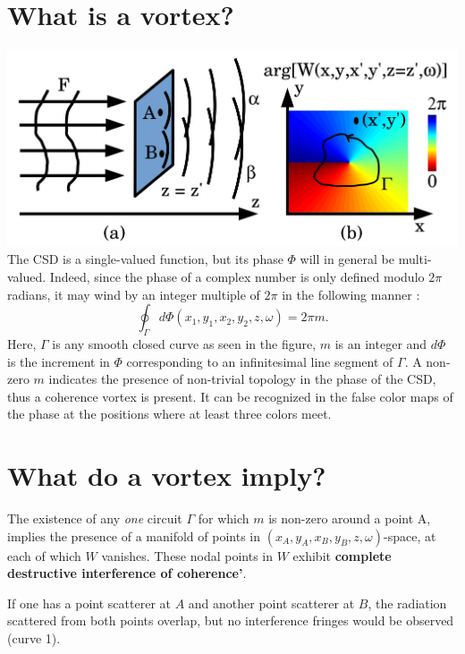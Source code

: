 \documentclass[a4paper,10pt]{article}
\begin{document}
\section{What is a vortex?}


\includegraphics[width=1\textwidth]{Figures/coherence_vortex.png}
The CSD is a single-valued function, but its phase $\Phi$ will in general be multi-valued. Indeed, since the phase of a complex number is only defined modulo $2\pi$ radians, it may wind by an integer multiple of $2\pi$ in the following manner \cite{GburVisser2003}: 
\begin{equation}
\label{phase_of_W_winding}
\oint_{\Gamma} d\Phi(x_1,y_1,x_2,y_2,z,\omega)=2\pi m.
\end{equation}
Here, $\Gamma$ is any smooth closed curve as seen in the figure, $m$ is an integer and $d\Phi$ is the increment in $\Phi$ corresponding to an infinitesimal line segment of $\Gamma$.
A non-zero $m$ indicates the presence of non-trivial topology in the phase of the CSD, thus a coherence vortex \cite{GburVisser2003} is present.  It can be recognized in the false color maps of the phase at the positions where at least three colors meet.

\section{What do a vortex imply?}

The existence of any {\em one} circuit $\Gamma$ for which $m$ is non-zero around a point A, implies the presence of a manifold of points in $(x_A,y_A,x_B,y_B,z,\omega)$-space, at each of which $W$ vanishes. These nodal points in $W$ exhibit {\bf complete destructive interference of coherence'}. 

If one has a point scatterer at $A$ and another point scatterer at $B$, the radiation scattered from both points overlap, but no interference fringes would be observed (curve 1).
\end{document}

